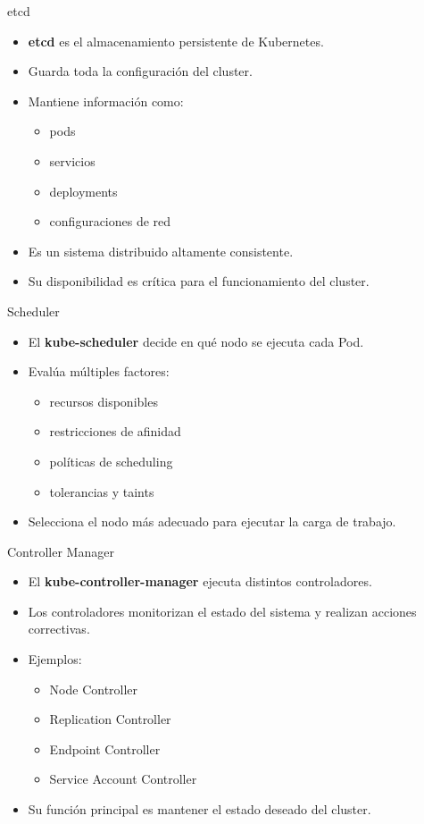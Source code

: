 \documentclass{beamer}
\begin{document}
\begin{frame}{etcd}
\begin{itemize}
\item \textbf{etcd} es el almacenamiento persistente de Kubernetes.
\item Guarda toda la configuración del cluster.
\item Mantiene información como:
\begin{itemize}
\item pods
\item servicios
\item deployments
\item configuraciones de red
\end{itemize}
\item Es un sistema distribuido altamente consistente.
\item Su disponibilidad es crítica para el funcionamiento del cluster.
\end{itemize}
\end{frame}

\begin{frame}{Scheduler}
\begin{itemize}
\item El \textbf{kube-scheduler} decide en qué nodo se ejecuta cada Pod.
\item Evalúa múltiples factores:
\begin{itemize}
\item recursos disponibles
\item restricciones de afinidad
\item políticas de scheduling
\item tolerancias y taints
\end{itemize}
\item Selecciona el nodo más adecuado para ejecutar la carga de trabajo.
\end{itemize}
\end{frame}

\begin{frame}{Controller Manager}
\begin{itemize}
\item El \textbf{kube-controller-manager} ejecuta distintos controladores.
\item Los controladores monitorizan el estado del sistema y realizan acciones correctivas.
\item Ejemplos:
\begin{itemize}
\item Node Controller
\item Replication Controller
\item Endpoint Controller
\item Service Account Controller
\end{itemize}
\item Su función principal es mantener el estado deseado del cluster.
\end{itemize}
\end{frame}
\end{document}
